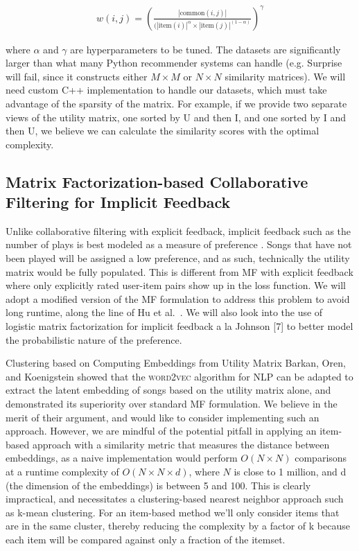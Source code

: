 \documentclass[conference]{IEEEtran}
\begin{document}
\begin{eqnarray*}
w(i, j) = \left(\frac{|\textrm{common}(i, j)|}{(|\textrm{item}(i)|^\alpha \times |\textrm{item}(j)|^{(1-\alpha)}}\right)^\gamma
\end{eqnarray*}

where $\alpha$ and $\gamma$ are hyperparameters to be tuned. The datasets are significantly larger than what many Python recommender systems can handle (e.g. Surprise will fail, since it constructs either $M\times M$ or $N\times N$ similarity matrices). We will need custom C++ implementation to handle our datasets, which must take advantage of the sparsity of the matrix. For example, if we provide two separate views of the utility matrix, one sorted by U and then I, and one sorted by I and then U, we believe we can calculate the similarity scores with the optimal complexity.

\subsection{Matrix Factorization-based Collaborative Filtering for Implicit Feedback}

Unlike collaborative filtering with explicit feedback, implicit feedback such as the number of plays is best modeled as a measure of preference \cite{hu2008collaborative}. Songs that have not been played will be assigned a low preference, and as such, technically the utility matrix would be fully populated. This is different from MF with explicit feedback where only explicitly rated user-item pairs show up in the loss function. We will adopt a modified version of the MF formulation to address this problem to avoid long runtime, along the line of Hu et al.~\cite{johnson2014logistic}. We will also look into the use of logistic matrix factorization for implicit feedback a la Johnson [7] to better model the probabilistic nature of the preference.

Clustering based on Computing Embeddings from Utility Matrix
Barkan, Oren, and Koenigstein \cite{barkan2016item2vec} showed that the \textsc{word2vec}
 algorithm for NLP can be adapted to extract the latent embedding of songs based on the utility matrix alone, and demonstrated its superiority over standard MF formulation. We believe in the merit of their argument, and would like to consider implementing such an approach. However, we are mindful of the potential pitfall in applying an item-based approach with a similarity metric that measures the distance between embeddings, as a naive implementation would perform
$O(N\times N)$ comparisons at a runtime complexity of $O(N\times N\times d)$, where $N$ is close to 1 million, and d (the dimension of the embeddings) is between 5 and 100. This is clearly impractical, and necessitates a clustering-based nearest neighbor approach such as k-mean clustering. For an item-based method we’ll only consider items that are in the same cluster, thereby reducing the complexity by a factor of k because each item will be compared against only a fraction of the itemset.
\end{document}
